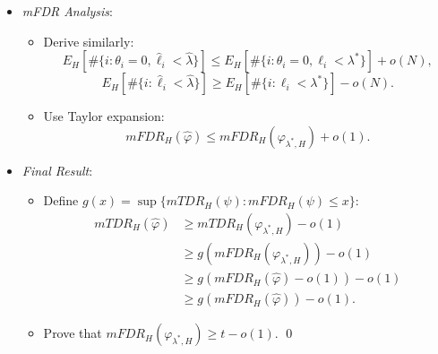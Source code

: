 \documentclass[10pt, aspectratio=169]{beamer}
\begin{document}
\begin{frame}
    \begin{itemize}[label=\scalebox{0.5}{$\bullet$}]
        \item \textit{mFDR Analysis}:
            \begin{itemize}[label=\scalebox{0.5}{$\bullet$}]
                \setlength{\itemsep}{\baselineskip}
                \item Derive similarly:
                \[
                E_H[\#\{i : \theta_i = 0, \hat{\ell}_i < \hat{\lambda}\}] \leq E_H[\#\{i : \theta_i = 0, \ell_i < \lambda^*\}] + o(N),
                \]
                \[
                E_H[\#\{i : \hat{\ell}_i < \hat{\lambda}\}] \geq E_H[\#\{i : \ell_i < \lambda^*\}] - o(N).
                \]
                \item Use Taylor expansion:
                \[
                mFDR_H(\hat{\varphi}) \leq mFDR_H(\varphi_{\lambda^*, H}) + o(1).
                \]
            \end{itemize}

        \item \textit{Final Result}:
            \begin{itemize}[label=\scalebox{0.5}{$\bullet$}]
                \setlength{\itemsep}{\baselineskip}
                \item Define \(g(x) = \sup\{mTDR_H(\psi) : mFDR_H(\psi) \leq x\}\):
                \begin{align*}
                mTDR_H(\hat{\varphi}) &\geq mTDR_H(\varphi_{\lambda^*, H}) - o(1) \\
                &\geq g(mFDR_H(\varphi_{\lambda^*, H})) - o(1) \\
                &\geq g(mFDR_H(\hat{\varphi}) - o(1)) - o(1) \\
                &\geq g(mFDR_H(\hat{\varphi})) - o(1).
                \end{align*}
                \item Prove that \(mFDR_H(\varphi_{\lambda^*, H}) \geq t - o(1)\). \qed
            \end{itemize}
    \end{itemize}
\end{frame}
\end{document}
